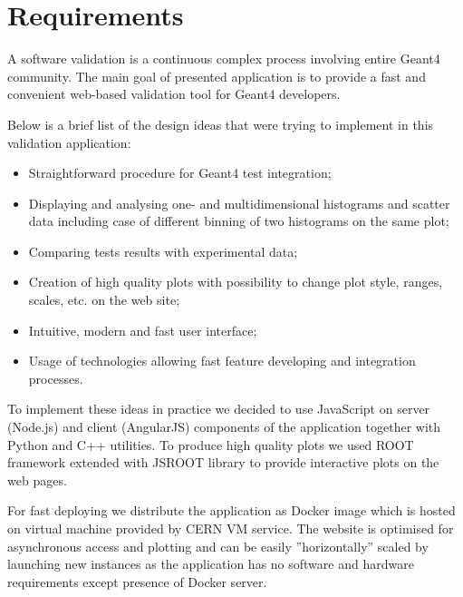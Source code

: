 \section{Requirements}
\label{sec:requirements}

A software validation is a continuous complex process involving entire Geant4 community. The main goal of presented application is to provide a fast and convenient web-based validation tool for Geant4 developers.

Below is a brief list of the design ideas that were trying to implement in this validation application:
\begin{itemize}
    \item Straightforward procedure for Geant4 test integration;
    \item Displaying and analysing one- and multidimensional histograms and scatter data including case of different binning of two histograms on the same plot;
    \item Comparing tests results with experimental data;
    \item Creation of high quality plots with possibility to change plot style, ranges, scales, etc. on the web site;
    \item Intuitive, modern and fast user interface;
    \item Usage of technologies allowing fast feature developing and integration processes.
\end{itemize}

To implement these ideas in practice we decided to use JavaScript on server (Node.js) and client (AngularJS) components of the application together with Python and C++ utilities. To produce high quality plots we used ROOT framework extended with JSROOT library to provide interactive plots on the web pages.

For fast deploying we distribute the application as Docker image which is hosted on virtual machine provided by CERN VM service. The website is optimised for asynchronous access and plotting and can be easily ''horizontally'' scaled by launching new instances as the application has no software and hardware requirements except presence of Docker server.


